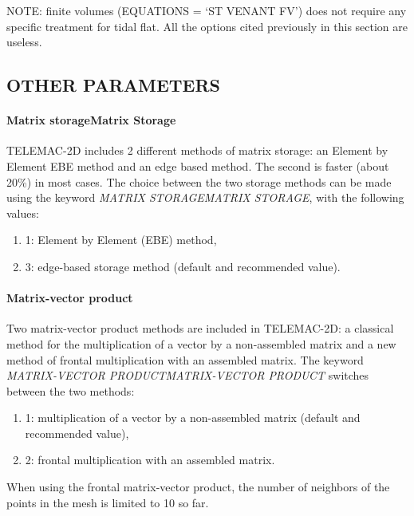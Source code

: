 \documentclass{article} %
\begin{document}
 NOTE: finite volumes (EQUATIONS = `ST VENANT FV') does not require any specific treatment for tidal flat. All the options cited previously in this section are useless.


\subsection{ OTHER PARAMETERS}


\paragraph{ Matrix storageMatrix Storage}

 TELEMAC-2D includes 2 different methods of matrix storage: an Element by Element EBE method and an edge based method. The second is faster (about 20\%) in most cases. The choice between the two storage methods can be made using the keyword \textit{MATRIX STORAGEMATRIX STORAGE}, with the following values:

\begin{enumerate}
\item  1: Element by Element (EBE) method,

\item  3: edge-based storage method (default and recommended value).
\end{enumerate}


\paragraph{ Matrix-vector product}

 Two matrix-vector product methods are included in TELEMAC-2D: a classical method for the multiplication of a vector by a non-assembled matrix and a new method of frontal multiplication with an assembled matrix. The keyword \textit{MATRIX-VECTOR PRODUCTMATRIX-VECTOR PRODUCT}  switches between the two methods:

\begin{enumerate}
\item  1: multiplication of a vector by a non-assembled matrix (default and recommended value),

\item  2: frontal multiplication with an assembled matrix.
\end{enumerate}

 When using the frontal matrix-vector product, the number of neighbors of the points in the mesh is limited to 10 so far.
\end{document}
